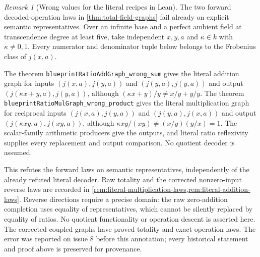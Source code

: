 \documentclass[11pt,oneside]{article}
\theoremstyle{definition}
\theoremstyle{remark}
\newtheorem{remark}[theorem]{Remark}
\newcommand{\lean}[1]{\nolinkurl{#1}}
\begin{document}
\begin{remark}[Wrong values for the literal recipes in Lean]\label{rem:literal-operation-values}
The two forward decoded-operation laws in \cref{thm:total-field-graphs} fail already
on explicit semantic representatives. Over an infinite base and a perfect ambient field
at transcendence degree at least five, take independent $x,y,a$ and $\kappa\in k$
with $\kappa\ne0,1$. Every numerator and denominator tuple below belongs to the
Frobenius class of $j(x,a)$.

The theorem \lean{blueprintRatioAddGraph_wrong_sum} gives the literal addition graph
for inputs $(j(x,a),j(y,a))$ and $(j(y,a),j(y,a))$ and output
$(j(\kappa x+y,a),j(y,a))$, although
$(\kappa x+y)/y\ne x/y+y/y$.
The theorem \lean{blueprintRatioMulGraph_wrong_product} gives the literal multiplication
graph for reciprocal inputs $(j(x,a),j(y,a))$ and $(j(y,a),j(x,a))$ and output
$(j(\kappa xy,a),j(xy,a))$, although $\kappa xy/(xy)\ne(x/y)(y/x)=1$.
The scalar-family arithmetic producers give the outputs, and literal ratio reflexivity
supplies every replacement and output comparison. No quotient decoder is assumed.

This refutes the forward laws on semantic representatives, independently of the
already refuted literal decoder. Raw totality and the corrected nonzero-input reverse
laws are recorded in \cref{rem:literal-multiplication-laws,rem:literal-addition-laws}.
Reverse directions require a precise domain: the raw zero-addition completion uses equality
of representatives, which cannot be silently replaced by equality of ratios. No quotient
functionality or operation descent is asserted here. The corrected coupled graphs have
proved totality and exact operation laws. The error was reported on issue 8 before this
annotation; every historical statement and proof above is preserved for provenance.
\end{remark}
\end{document}
